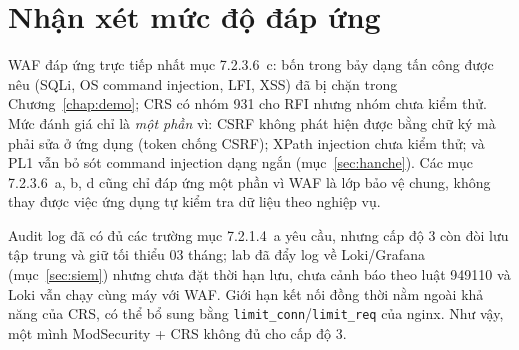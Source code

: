 \section{Nhận xét mức độ đáp ứng}
WAF đáp ứng trực tiếp nhất mục 7.2.3.6~c: bốn trong bảy dạng tấn công được nêu (SQLi, OS command injection, LFI, XSS) đã bị chặn trong Chương~\ref{chap:demo}; CRS có nhóm 931 cho RFI nhưng nhóm chưa kiểm thử. Mức đánh giá chỉ là \textit{một phần} vì: CSRF không phát hiện được bằng chữ ký mà phải sửa ở ứng dụng (token chống CSRF); XPath injection chưa kiểm thử; và PL1 vẫn bỏ sót command injection dạng ngắn (mục~\ref{sec:hanche}). Các mục 7.2.3.6~a, b, d cũng chỉ đáp ứng một phần vì WAF là lớp bảo vệ chung, không thay được việc ứng dụng tự kiểm tra dữ liệu theo nghiệp vụ.

Audit log đã có đủ các trường mục 7.2.1.4~a yêu cầu, nhưng cấp độ 3 còn đòi lưu tập trung và giữ tối thiểu 03 tháng; lab đã đẩy log về Loki/Grafana (mục~\ref{sec:siem}) nhưng chưa đặt thời hạn lưu, chưa cảnh báo theo luật 949110 và Loki vẫn chạy cùng máy với WAF. Giới hạn kết nối đồng thời nằm ngoài khả năng của CRS, có thể bổ sung bằng \texttt{limit\_conn}/\texttt{limit\_req} của nginx. Như vậy, một mình ModSecurity + CRS không đủ cho cấp độ 3.

